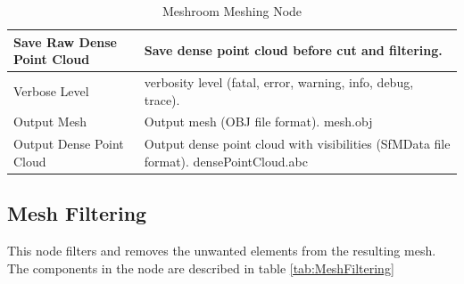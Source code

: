 \documentclass[12pt]{report}
\begin{document}
\begin{table}[H]
{\begin{tabular}{|l|l|}
    Save Raw Dense Point Cloud                & Save dense point cloud before cut and filtering.                                         \\ \hline
    Verbose Level                             & verbosity level (fatal, error, warning, info, debug, trace).                             \\ \hline
    Output Mesh                               & Output mesh (OBJ file format). mesh.obj                                                  \\ \hline
    Output Dense Point Cloud                  & Output dense point cloud with visibilities (SfMData file format). densePointCloud.abc    \\ \hline
    \end{tabular}%
    }
    \caption{Meshroom Meshing Node}
    \label{tab:Meshing}
    \end{table}
  

\subsection{Mesh Filtering}

This node filters and removes the unwanted elements from the resulting mesh.
The components in the node are described in table \ref{tab:MeshFiltering}
\end{document}
